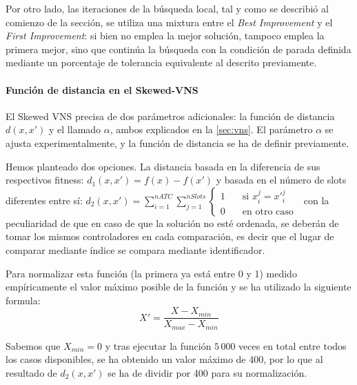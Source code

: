 Por otro lado, las iteraciones de la búsqueda local, tal y como se describió al comienzo de la sección, se utiliza una mixtura entre el \textit{Best Improvement} y el \textit{First Improvement}: si bien no emplea la mejor solución, tampoco emplea la primera mejor, sino que continúa la búsqueda con la condición de parada definida mediante un porcentaje de tolerancia equivalente al descrito previamente.

\paragraph{Función de distancia en el Skewed-VNS}
El Skewed VNS precisa de dos parámetros adicionales: la función de distancia $d(x,x')$ y el llamado $\alpha$, ambos explicados en la \autoref{sec:vns}. El parámetro $\alpha$ se ajusta experimentalmente, y la función de distancia se ha de definir previamente.

Hemos planteado dos opciones. La distancia basada en la diferencia de sus respectivos fitness: $d_1(x,x')=f(x)-f(x')$ y basada en el número de slots diferentes entre sí:
$
d_2(x,x')=\sum_{i=1}^{nATC} \sum_{j=1}^{nSlots}
\begin{cases}
    1 & \quad \textrm{si } x_i^j = {x'}_i^j \\
    0 & \quad \textrm{en otro caso }
\end{cases}
$ con la peculiaridad de que en caso de que la solución no esté ordenada, se deberán de tomar los mismos controladores en cada comparación, es decir que el lugar de comparar mediante índice se compara mediante identificador.

Para normalizar esta función (la primera ya está entre 0 y 1) medido empíricamente el valor máximo posible de la función
y se ha utilizado la siguiente formula:
\[
    X' = \frac{X-X_{min}}{X_{max}-X_{min}}
\]

Sabemos que $X_{min}=0$ y tras ejecutar la función $5\,000$ veces en total entre todos los casos disponibles, se ha obtenido un valor máximo de 400, por lo que al resultado de $d_2(x,x')$ se ha de dividir por 400 para su normalización.


